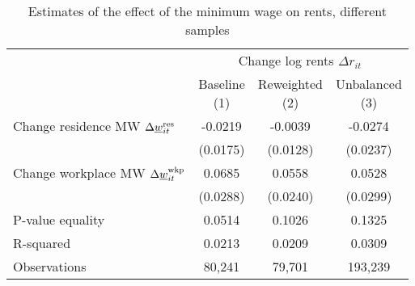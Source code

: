 \begin{table}[hbt!]
    \centering
    \caption{Estimates of the effect of the minimum wage on rents, different samples}
    \label{tab:static_sample}

    \begin{tabular}{@{}lccc@{}}
        \toprule
                                             & \multicolumn{3}{c}{Change log rents $\Delta r_{it}$}            \\ \cmidrule(l){2-4} 
                                             & \shortstack{Baseline\\(1)}       & \shortstack{Reweighted\\(2)} 
                                             & \shortstack{Unbalanced\\(3)}                                    \\ \midrule
        Change residence MW 
                  $\Delta\underline{w}_{it}^{\text{res}}$    & -0.0219      & -0.0039        & -0.0274         \\
                                             & (0.0175)    & (0.0128)      & (0.0237)       \\
        Change workplace MW 
                   $\Delta\underline{w}_{it}^{\text{wkp}}$   & 0.0685      & 0.0558        & 0.0528         \\
                                             & (0.0288)    & (0.0240)      & (0.0299)       \\ \midrule
        P-value equality                     & 0.0514      & 0.1026        & 0.1325         \\
        R-squared                            & 0.0213      & 0.0209        & 0.0309         \\
        Observations                         & 80,241     & 79,701       & 193,239        \\ \bottomrule
    \end{tabular}


\end{table}
